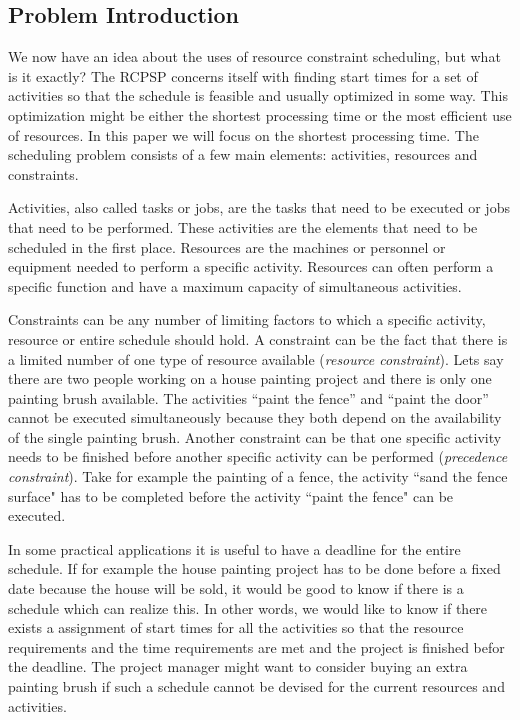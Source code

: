 \documentclass{article}
\theoremstyle{definition}
\begin{document}
\subsection{Problem Introduction}
We now have an idea about the uses of resource constraint scheduling, but what is it exactly?
The RCPSP concerns itself with finding start times for a set of activities so that the schedule is feasible and usually optimized in some way.
This optimization might be either the shortest processing time or the most efficient use of resources.
In this paper we will focus on the shortest processing time.
The scheduling problem consists of a few main elements: activities, resources and constraints.

Activities, also called tasks or jobs, are the tasks that need to be executed or jobs that need to be performed.
These activities are the elements that need to be scheduled in the first place.
Resources are the machines or personnel or equipment needed to perform a specific activity.
Resources can often perform a specific function and have a maximum capacity of simultaneous activities.

Constraints can be any number of limiting factors to which a specific activity, resource or entire schedule should hold.
A constraint can be the fact that there is a limited number of one type of resource available (\emph{resource constraint}).
Lets say there are two people working on a house painting project and there is only one painting brush available. 
The activities ``paint the fence'' and ``paint the door'' cannot be executed simultaneously because they both depend on the availability of the single painting brush. 
Another constraint can be that one specific activity needs to be finished before another specific activity can be performed (\emph{precedence constraint}).
Take for example the painting of a fence, the activity ``sand the fence surface" has to be completed before the activity ``paint the fence" can be executed. 

In some practical applications it is useful to have a deadline for the entire schedule. 
If for example the house painting project has to be done before a fixed date because the house will be sold, it would be good to know if there is a schedule which can realize this. 
In other words, we would like to know if there exists a assignment of start times for all the activities so that the resource requirements and the time requirements are met and the project is finished befor the deadline.
The project manager might want to consider buying an extra painting brush if such a schedule cannot be devised for the current resources and activities. 
\end{document}
